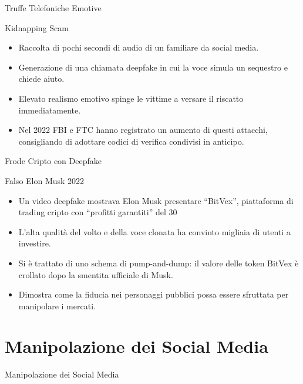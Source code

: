 \documentclass[12pt]{beamer}
\begin{document}
\begin{frame}{Truffe Telefoniche Emotive}
  \begin{alertblock}{Kidnapping Scam}
    \begin{itemize}
      \item Raccolta di pochi secondi di audio di un familiare da social media.
      \item Generazione di una chiamata deepfake in cui la voce simula un sequestro e chiede aiuto.
      \item Elevato realismo emotivo spinge le vittime a versare il riscatto immediatamente.
      \item Nel 2022 FBI e FTC hanno registrato un aumento di questi attacchi, consigliando di adottare codici di verifica condivisi in anticipo.\cite{fbi_2022_deepfake_kidnap}\cite{ftc_2022_deepfake_kidnap}
    \end{itemize}
  \end{alertblock}
\end{frame}

\begin{frame}{Frode Cripto con Deepfake}
  \small
  \begin{alertblock}{Falso Elon Musk 2022}
    \begin{itemize}
      \item Un video deepfake mostrava Elon Musk presentare “BitVex”, piattaforma di trading cripto con “profitti garantiti” del 30 %
      \item L’alta qualità del volto e della voce clonata ha convinto migliaia di utenti a investire.  
      \item Si è trattato di uno schema di pump-and-dump: il valore delle token BitVex è crollato dopo la smentita ufficiale di Musk.  
      \item Dimostra come la fiducia nei personaggi pubblici possa essere sfruttata per manipolare i mercati.\cite{forbes_bitvex2022}
    \end{itemize}
  \end{alertblock}
\end{frame}

\section{Manipolazione dei Social Media}

\begin{frame}
\Huge
\begin{center}
Manipolazione dei Social Media
\end{center}
\end{frame}
\end{document}
